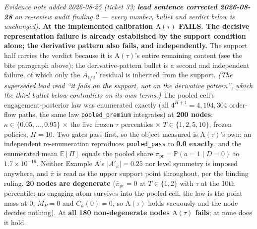 \documentclass[11pt,a4paper]{article}
\newcommand{\Eop}{\mathbb{E}}
\newcommand{\Prb}{\mathbb{P}}
\newcommand{\Atau}{\mathrm{A}(\tau)}
\newcommand{\Akap}{A'_{\kappa}}
\begin{document}
\begin{description}[leftmargin=1.9em,style=unboxed]
  \emph{Evidence note added 2026-08-25 (ticket 33; \textbf{lead sentence corrected
  2026-08-28} on re-review audit finding 2 --- every number, bullet and verdict below is
  unchanged).} \textbf{At the implemented calibration $\Atau$ FAILS. The decisive
  representation failure is already established by the support condition alone; the
  derivative pattern also fails, and independently.} The support half carries the verdict
  because it is $\Atau$'s entire remaining content (see the bite paragraph above); the
  derivative-pattern bullet is a second and independent failure, of which only the
  $A_{1/2}'$ residual is inherited from the support. \emph{(The superseded lead read ``it
  fails on the support, not on the derivative pattern'', which the third bullet below
  contradicts on its own terms.)} The pooled cell's engagement-posterior law was
  enumerated exactly
  (all $4^{H+1}=4{,}194{,}304$ order-flow paths, the same law \texttt{pooled\_premium}
  integrates) at \textbf{200 nodes}: $\kappa\in\{0.05,\dots,0.95\}$ $\times$ the five
  frozen $\tau$ percentiles $\times$ $T\in\{1,2,5,10\}$, frozen policies, $H=10$. Two
  gates pass first, so the object measured is $\Atau$'s own: an independent
  re-enumeration reproduces \texttt{pooled\_pass} to \textbf{0.0 exactly}, and the
  enumerated mean $\Eop[\Pi]$ equals the pooled share
  $\bar\pi_{\mathrm{pr}}=\Prb(a=1\mid D=0)$ to $1.7\times10^{-16}$. Neither Example A's
  $\lvert\Akap\rvert=0.25$ nor level symmetry is imposed anywhere, and $\bar\pi$ is read
  as the upper support point throughout, per the binding ruling. \textbf{20 nodes are
  degenerate} ($\bar\pi_{\mathrm{pr}}=0$ at $T\in\{1,2\}$ with $\tau$ at the 10th
  percentile: no engaging atom survives into the pooled cell, the law is the point mass
  at $0$, $M_P=0$ and $C_h(0)=0$, so $\Atau$ holds vacuously and the node decides
  nothing). At \textbf{all 180 non-degenerate nodes $\Atau$ fails}; at none does it hold.


\end{description}
\end{document}
